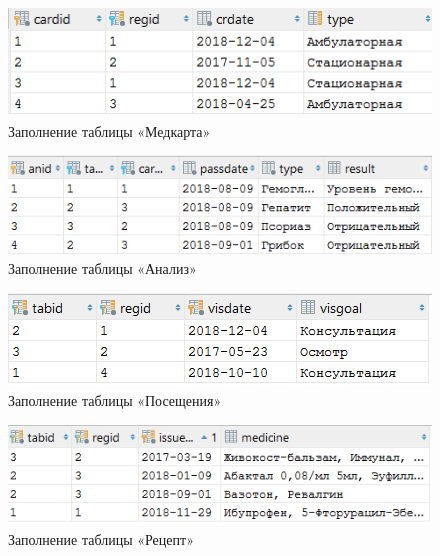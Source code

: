 \documentclass[14pt,a4paper,russian]{extreport}
\begin{document}
\vspace{0.00mm}

\begin{figure}[h!]
        \center\includegraphics[scale=1]{medcard}
        \caption{Заполнение таблицы «Медкарта»}
        \label{fig:medcard}
\end{figure}

\vspace{0.00mm}

\begin{figure}[h!]
        \center\includegraphics[scale=1]{analysis}
        \caption{Заполнение таблицы «Анализ»}
        \label{fig:employee}
\end{figure}

\vspace{0.00mm}

\begin{figure}[h!]
        \center\includegraphics[scale=1]{visit}
        \caption{Заполнение таблицы «Посещения»}
        \label{fig:visit}
\end{figure}

\vspace{0.00mm}

\begin{figure}[h]
        \center\includegraphics[scale=1]{ireceipt}
        \caption{Заполнение таблицы «Рецепт»}
        \label{fig:ireceipt}
\end{figure}
\end{document}
